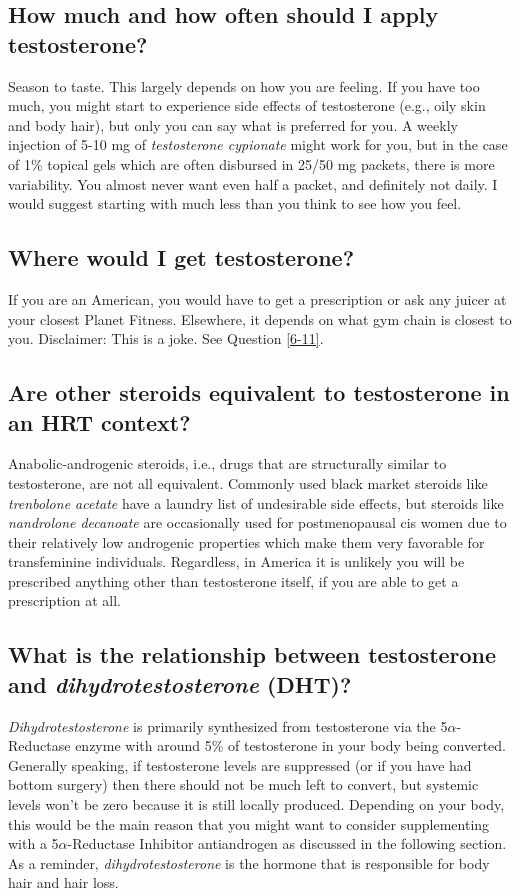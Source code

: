 \documentclass{article}
\begin{document}
\subsection{How much and how often should I apply testosterone?}

Season to taste. This largely depends on how you are feeling. If you have too much, you might start to experience side effects of testosterone (e.g., oily skin and body hair), but only you can say what is preferred for you. A weekly injection of 5-10 mg of \textit{testosterone cypionate} might work for you, but in the case of 1\% topical gels which are often disbursed in 25/50 mg packets, there is more variability. You almost never want even half a packet, and definitely not daily. I would suggest starting with much less than you think to see how you feel.

\subsection{Where would I get testosterone?}

If you are an American, you would have to get a prescription or ask any juicer at your closest Planet Fitness. Elsewhere, it depends on what gym chain is closest to you. Disclaimer: This is a joke. See Question \ref{6-11}.

\subsection{Are other steroids equivalent to testosterone in an HRT context?}

Anabolic-androgenic steroids, i.e., drugs that are structurally similar to testosterone, are not all equivalent. Commonly used black market steroids like \textit{trenbolone acetate} have a laundry list of undesirable side effects, but steroids like \textit{nandrolone decanoate} are occasionally used for postmenopausal cis women due to their relatively low androgenic properties which make them very favorable for transfeminine individuals. Regardless, in America it is unlikely you will be prescribed anything other than testosterone itself, if you are able to get a prescription at all.

\subsection{What is the relationship between testosterone and \textit{dihydrotestosterone} (DHT)?}

\textit{Dihydrotestosterone} is primarily synthesized from testosterone via the 5$\alpha$-Reductase enzyme with around 5\% of testosterone in your body being converted. Generally speaking, if testosterone levels are suppressed (or if you have had bottom surgery) then there should not be much left to convert, but systemic levels won’t be zero because it is still locally produced. Depending on your body, this would be the main reason that you might want to consider supplementing with a 5$\alpha$-Reductase Inhibitor antiandrogen as discussed in the following section. As a reminder, \textit{dihydrotestosterone} is the hormone that is responsible for body hair and hair loss.
\end{document}
